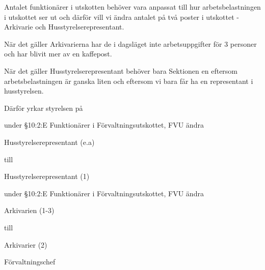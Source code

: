 \documentclass[../_main/handlingar.tex]{subfiles}
\begin{document}

Antalet funktionärer i utskotten behöver vara anpassat till hur arbetsbelastningen i utskottet ser ut och därför vill vi ändra antalet på två poster i utskottet - Arkivarie och Husstyrelserepresentant.

När det gäller Arkivarierna har de i dagsläget inte arbetsuppgifter för 3 personer och har blivit mer av en kaffepost.

När det gäller Husstyrelserepresentant behöver bara Sektionen en eftersom arbetsbelastningen är ganska liten och eftersom vi bara får ha en representant i husstyrelsen.

Därför yrkar styrelsen på
\begin{attsatser}
    \att under \S10:2:E Funktionärer i Förvaltningsutskottet, FVU ändra\par
    \begin{itshape}
        Husstyrelserepresentant (e.a)
    \end{itshape}\par
    till\par
    \begin{itshape}
        Husstyrelserepresentant (1)
    \end{itshape}

    \att under \S10:2:E Funktionärer i Förvaltningsutskottet, FVU ändra\par
    \begin{itshape}
        Arkivarien (1-3)
    \end{itshape}\par
    till\par
    \begin{itshape}
        Arkivarier (2)
    \end{itshape}
\end{attsatser}

\begin{signatures}{1}
    \ist
    \signature{Anders Nilsson}{Förvaltningschef}
\end{signatures}
\end{document}
